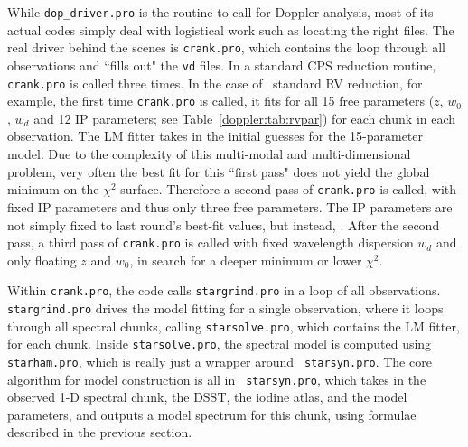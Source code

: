 While {\tt dop\_driver.pro} is the
routine to call for Doppler analysis, most of its actual codes simply
deal with logistical work such as locating the right files. The real
driver behind the scenes is {\tt crank.pro}, which contains the loop
through all observations and ``fills out" the {\tt vd} files. In a
standard CPS reduction routine, {\tt crank.pro} is called three
times. In the case of \keck\ standard RV reduction, for example, the
first time {\tt crank.pro} is called, it fits for all 15 free
parameters ($z$, $w_0$, $w_d$ and 12 IP parameters; see
Table~\ref{doppler:tab:rvpar}) for each chunk in each observation. The
LM fitter takes in the initial guesses for  the 15-parameter model. Due to the complexity of this
multi-modal and multi-dimensional problem, very often the best fit for
this ``first pass" does not yield the global minimum on the $\chi^2$
surface. Therefore a second pass of {\tt crank.pro} is called, with
fixed IP parameters and thus only three free parameters. The IP
parameters are not simply fixed to last round's best-fit values, but
instead, . After the second pass, a third pass of {\tt crank.pro}
is called with fixed wavelength dispersion $w_d$ and only floating $z$
and $w_0$, in search for a deeper minimum or lower
$\chi^2$. 

Within {\tt crank.pro}, the code calls
{\tt stargrind.pro} in a loop of all observations. {\tt stargrind.pro}
drives the model fitting for a single observation, where it loops
through all spectral chunks, calling {\tt starsolve.pro}, which
contains the LM fitter, for each chunk. Inside {\tt starsolve.pro},
the spectral model  is computed
using {\tt starham.pro}, which is really just a wrapper around {\tt
starsyn.pro}. The core algorithm for model construction is all in {\tt
starsyn.pro}, which takes in the observed 1-D spectral chunk, the
DSST, the iodine atlas, and the model parameters, and outputs a model
spectrum for this chunk, using formulae described in the previous
section.



